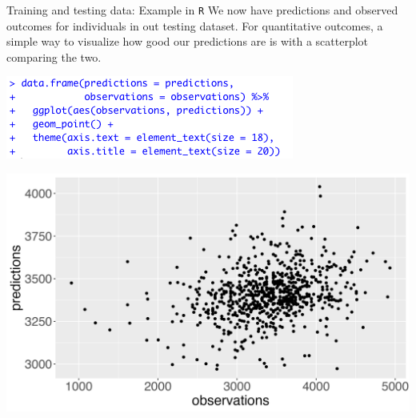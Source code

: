 \documentclass[10pt,t]{beamer}
\begin{document}
\begin{frame}{Training and testing data: Example in \texttt{R}}
We now have predictions and observed outcomes for individuals in out testing dataset. For quantitative outcomes, a simple way to visualize how good our predictions are is with a scatterplot comparing the two.

\vspace{0.3cm}

\centering \includegraphics[scale=0.4]{figures/predict_vs_obs_code.png} \vspace{0.1cm}

\includegraphics[scale=0.3]{figures/predict_vs_obs.png}

\end{frame}
\end{document}
